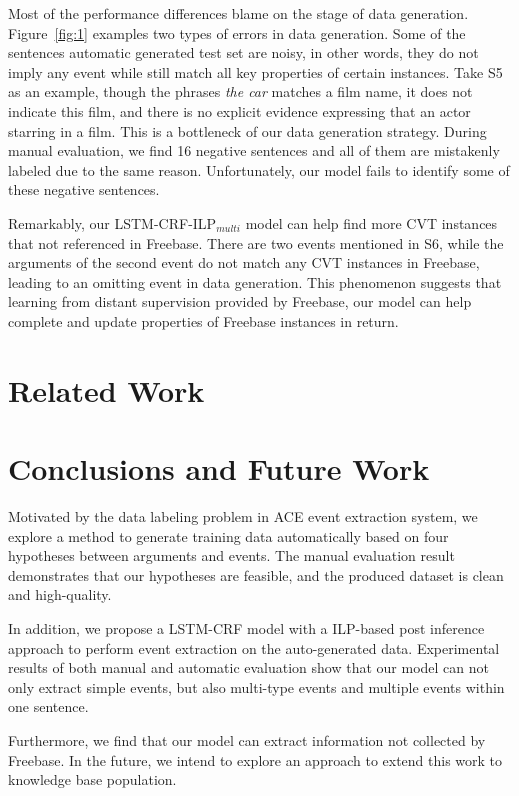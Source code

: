\documentclass{article}
\begin{document}
Most of the performance differences blame on the stage of data generation. Figure~\ref{fig:1} examples two types of errors in data generation. Some of the sentences automatic generated test set are noisy, in other words, they do not imply any event while still match all key properties of certain instances. Take S5 as an example, though the phrases \emph{the car} matches a film name, it does not indicate this film, and there is no explicit evidence expressing that an actor starring in a film. This is a bottleneck of our data generation strategy. During manual evaluation, we find 16 negative sentences and all of them are mistakenly labeled due to the same reason. Unfortunately, our model fails to identify some of these negative sentences.

Remarkably, our LSTM-CRF-ILP$_{multi}$ model can help find more CVT instances that not referenced in Freebase. There are two events mentioned in S6, while the arguments of the second event do not match any CVT instances in Freebase, leading to an omitting event in data generation. This phenomenon suggests that learning from distant supervision provided by Freebase, our model can help complete and update properties of Freebase instances in return.

\section{Related Work}

\section{Conclusions and Future Work}
Motivated by the data labeling problem in ACE event extraction system, we explore a method to generate training data automatically based on four hypotheses between arguments and events. The manual evaluation result demonstrates that our hypotheses are feasible, and the produced dataset is clean and high-quality.

In addition, we propose a LSTM-CRF model with a ILP-based post inference approach to perform event extraction on the auto-generated data. Experimental results of both manual and automatic evaluation show that our model can not only extract simple events, but also multi-type events and multiple events within one sentence.

Furthermore, we find that our model can extract information not collected by Freebase. In the future, we intend to explore an approach to extend this work to knowledge base population. 




\end{document}
